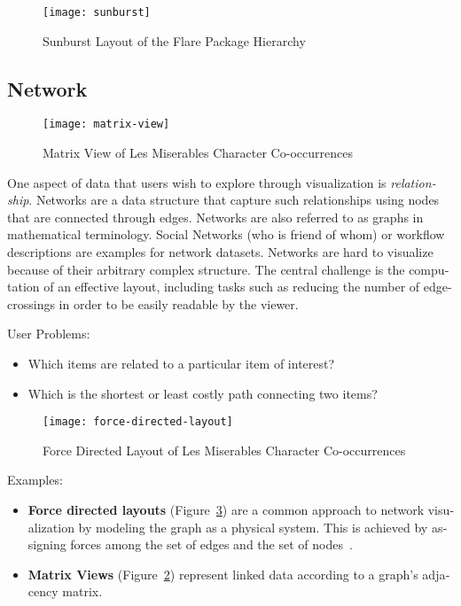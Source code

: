 \begin{english}
\begin{figure}
\centering
\texttt{[image: sunburst]}
\caption{Sunburst Layout of the Flare Package Hierarchy}
\label{fig:sunburst}
\end{figure}


\subsection{Network}

\begin{figure}
\centering
\texttt{[image: matrix-view]}
\caption{Matrix View of Les Miserables Character Co-occurrences}
\label{fig:matrix-view}
\end{figure}

One aspect of data that users wish to explore through visualization is \emph{relationship}. Networks are a data structure that capture such relationships using nodes that are connected through edges. Networks are also referred to as graphs in mathematical terminology. Social Networks (who is friend of whom) or workflow descriptions are examples for network datasets. Networks are hard to visualize because of their arbitrary complex structure. The central challenge is the computation of an effective layout, including tasks such as reducing the number of edge-crossings in order to be easily readable by the viewer.

\SuperPar User Problems:

\begin{itemize}
\item Which items are related to a particular item of interest?
\item Which is the shortest or least costly path connecting two items?
\end{itemize}

\begin{figure}
\centering
\texttt{[image: force-directed-layout]}
\caption{Force Directed Layout of Les Miserables Character Co-occurrences}
\label{fig:force-directed-layout}
\end{figure}

\SuperPar Examples:

\begin{itemize}
\item \textbf{Force directed layouts} (Figure~\ref{fig:force-directed-layout}) are a common approach to network visualization by modeling the graph as a physical system. This is achieved by assigning forces among the set of edges and the set of nodes~\cite{VisualizationZoo:2010}.
\item \textbf{Matrix Views} (Figure~\ref{fig:matrix-view}) represent linked data according to a graph's adjacency matrix.
\end{itemize}



\end{english}
